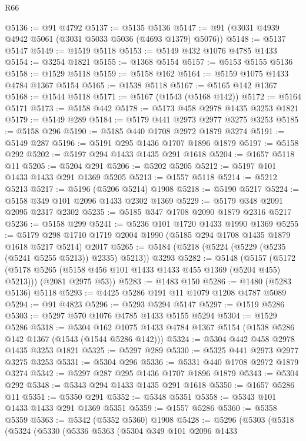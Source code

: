 \begin{lexlean}{R66}
\begin{coremodule}
@5136 := @91 @4792
@5137 := @5135 @5136
@5147 := @91 (@3031 @4939 @4942 @5061 (@3031 @5033 @5036 (@4693 @1379) @5076))
@5148 := @5137 @5147
@5149 := @1519 @5118
@5153 := @5149 @432 @1076 @4785 @1433
@5154 := @3254 @1821
@5155 := @1368 @5154
@5157 := @5153 @5155 @5136
@5158 := @1529 @5118
@5159 := @5158 @162
@5164 := @5159 @1075 @1433 @4784 @1367 @5154
@5165 := @1538 @5118
@5167 := @5165 @142 @1367
@5168 := @1544 @5118
@5171 := @5167 (@1543 (@5168 @142))
@5172 := @5164 @5171
@5173 := @5158 @442
@5178 := @5173 @458 @2978 @1435 @3253 @1821
@5179 := @5149 @289
@5184 := @5179 @441 @2973 @2977 @3275 @3253
@5185 := @5158 @296
@5190 := @5185 @440 @1708 @2972 @1879 @3274
@5191 := @5149 @287
@5196 := @5191 @295 @1436 @1707 @1896 @1879
@5197 := @5158 @292
@5202 := @5197 @294 @1433 @1435 @291 @1618
@5204 := @1657 @5118 @11
@5205 := @5204 @291
@5206 := @5202 @5205
@5212 := @5197 @101 @1433 @1433 @291 @1369 @5205
@5213 := @1557 @5118
@5214 := @5212 @5213
@5217 := @5196 (@5206 @5214) @1908
@5218 := @5190 @5217
@5224 := @5158 @349 @101 @2096 @1433 @2302 @1369
@5229 := @5179 @348 @2091 @2095 @2317 @2302
@5235 := @5185 @347 @1708 @2090 @1879 @2316 @5217
@5236 := @5158 @299
@5241 := @5236 @101 @1720 @1433 @1990 @1369
@5255 := @5179 @298 @1710 @1719 @2004 @1990 (@5185 @294 @1708 @1435 @1879 @1618 @5217 @5214) @2017
@5265 := @5184 (@5218 (@5224 (@5229 (@5235 (@5241 @5255 @5213)) @2335) @5213)) @3293
@5282 := @5148
    (@5157
      (@5172 (@5178 @5265 (@5158 @456 @101 @1433 @1433 @455 @1369 (@5204 @455) @5213)))
      (@2081 @2975 @53))
@5283 := @1483 @150
@5286 := @1480 (@5283 @5136) @5118
@5293 := @4425 @5286 @191 @11 @1079 @1208 @4787 @5089
@5294 := @91 @4823
@5296 := @5293 @5294 @5147
@5297 := @1519 @5286
@5303 := @5297 @570 @1076 @4785 @1433 @5155 @5294
@5304 := @1529 @5286
@5318 := @5304
    @162
    @1075
    @1433
    @4784
    @1367
    @5154
    (@1538 @5286 @142 @1367 (@1543 (@1544 @5286 @142)))
@5324 := @5304 @442 @458 @2978 @1435 @3253 @1821
@5325 := @5297 @289
@5330 := @5325 @441 @2973 @2977 @3275 @3253
@5331 := @5304 @296
@5336 := @5331 @440 @1708 @2972 @1879 @3274
@5342 := @5297 @287 @295 @1436 @1707 @1896 @1879
@5343 := @5304 @292
@5348 := @5343 @294 @1433 @1435 @291 @1618
@5350 := @1657 @5286 @11
@5351 := @5350 @291
@5352 := @5348 @5351
@5358 := @5343 @101 @1433 @1433 @291 @1369 @5351
@5359 := @1557 @5286
@5360 := @5358 @5359
@5363 := @5342 (@5352 @5360) @1908
@5428 := @5296
    (@5303
      (@5318
        (@5324
          (@5330
            (@5336
              @5363
              (@5304
                @349
                @101
                @2096
                @1433

\end{coremodule}
\end{lexlean}
